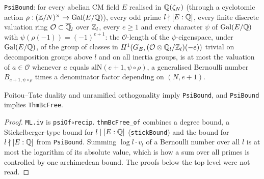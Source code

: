 \begin{definition}\label{sha:psibound}
\texttt{PsiBound}: for every abelian CM field $E$ realised in $\mathbb{Q}(\zeta_N)$ (through a
cyclotomic action $\rho:(\mathbb{Z}/N)^{\times}\to\operatorname{Gal}(E/\mathbb{Q})$), every odd prime $l\nmid[E:\mathbb{Q}]$, every
finite discrete valuation ring $\mathcal O\subset\overline{\mathbb{Q}}_l$ over $\mathbb{Z}_l$, every $e\ge1$ and
every character $\psi$ of $\operatorname{Gal}(E/\mathbb{Q})$ with $\psi(\rho(-1))=(-1)^{e+1}$: the $\mathcal
O$-length of the $\psi$-eigenspace, under $\operatorname{Gal}(E/\mathbb{Q})$, of the group of classes in
$H^1(G_E,(\mathcal O\otimes\mathbb{Q}_l/\mathbb{Z}_l)(-e))$ trivial on decomposition groups above $l$ and on
all inertia groups, is at most the valuation of $a\in\mathcal O$ whenever $a$ equals
$\mathrm{alN}(e+1,\psi\circ\rho)$, a generalised Bernoulli number $B_{e+1,\psi\circ\rho}$
times a denominator factor depending on $(N,e+1)$.
\end{definition}

\begin{theorem}\label{sha:thmbcfree-of}
Poitou--Tate duality and unramified orthogonality imply \texttt{PsiBound}, and
\texttt{PsiBound} implies \texttt{ThmBcFree}.
\end{theorem}
\begin{proof}
\texttt{ML.iv} is \texttt{psiOf}$\circ$\texttt{recip}. \texttt{thmBcFree\_of} combines a
degree bound, a Stickelberger-type bound for $l\mid[E:\mathbb{Q}]$ (\texttt{stickBound}) and the
bound for $l\nmid[E:\mathbb{Q}]$ from \texttt{PsiBound}. Summing $\log l\cdot v_l$ of a Bernoulli
number over all $l$ is at most the logarithm of its absolute value, which is how a sum over
all primes is controlled by one archimedean bound. The proofs below the top level were not
read.
\end{proof}

